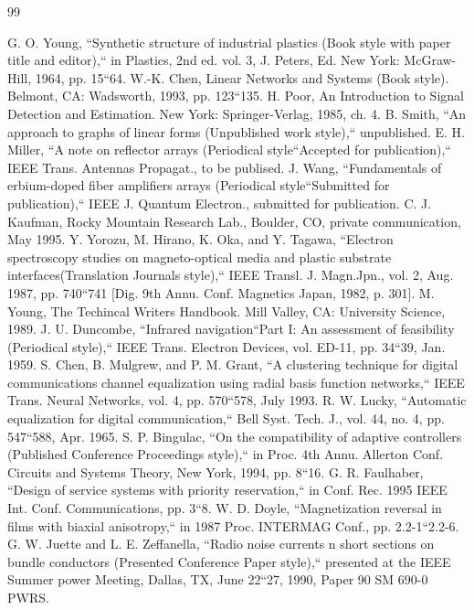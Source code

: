 \documentclass[letterpaper, 10 pt, conference]{ieeeconf}
\begin{document}
\begin{thebibliography}{99}

 G. O. Young, ``Synthetic structure of industrial plastics (Book style with paper title and editor),`` 	in Plastics, 2nd ed. vol. 3, J. Peters, Ed.  New York: McGraw-Hill, 1964, pp. 15``64.
 W.-K. Chen, Linear Networks and Systems (Book style).	Belmont, CA: Wadsworth, 1993, pp. 123``135.
 H. Poor, An Introduction to Signal Detection and Estimation.   New York: Springer-Verlag, 1985, ch. 4.
 B. Smith, ``An approach to graphs of linear forms (Unpublished work style),`` unpublished.
 E. H. Miller, ``A note on reflector arrays (Periodical style``Accepted for publication),`` IEEE Trans. Antennas Propagat., to be publised.
 J. Wang, ``Fundamentals of erbium-doped fiber amplifiers arrays (Periodical style``Submitted for publication),`` IEEE J. Quantum Electron., submitted for publication.
 C. J. Kaufman, Rocky Mountain Research Lab., Boulder, CO, private communication, May 1995.
 Y. Yorozu, M. Hirano, K. Oka, and Y. Tagawa, ``Electron spectroscopy studies on magneto-optical media and plastic substrate interfaces(Translation Journals style),`` IEEE Transl. J. Magn.Jpn., vol. 2, Aug. 1987, pp. 740``741 [Dig. 9th Annu. Conf. Magnetics Japan, 1982, p. 301].
 M. Young, The Techincal Writers Handbook.  Mill Valley, CA: University Science, 1989.
 J. U. Duncombe, ``Infrared navigation``Part I: An assessment of feasibility (Periodical style),`` IEEE Trans. Electron Devices, vol. ED-11, pp. 34``39, Jan. 1959.
 S. Chen, B. Mulgrew, and P. M. Grant, ``A clustering technique for digital communications channel equalization using radial basis function networks,`` IEEE Trans. Neural Networks, vol. 4, pp. 570``578, July 1993.
 R. W. Lucky, ``Automatic equalization for digital communication,`` Bell Syst. Tech. J., vol. 44, no. 4, pp. 547``588, Apr. 1965.
 S. P. Bingulac, ``On the compatibility of adaptive controllers (Published Conference Proceedings style),`` in Proc. 4th Annu. Allerton Conf. Circuits and Systems Theory, New York, 1994, pp. 8``16.
 G. R. Faulhaber, ``Design of service systems with priority reservation,`` in Conf. Rec. 1995 IEEE Int. Conf. Communications, pp. 3``8.
 W. D. Doyle, ``Magnetization reversal in films with biaxial anisotropy,`` in 1987 Proc. INTERMAG Conf., pp. 2.2-1``2.2-6.
 G. W. Juette and L. E. Zeffanella, ``Radio noise currents n short sections on bundle conductors (Presented Conference Paper style),`` presented at the IEEE Summer power Meeting, Dallas, TX, June 22``27, 1990, Paper 90 SM 690-0 PWRS.

\end{thebibliography}
\end{document}
